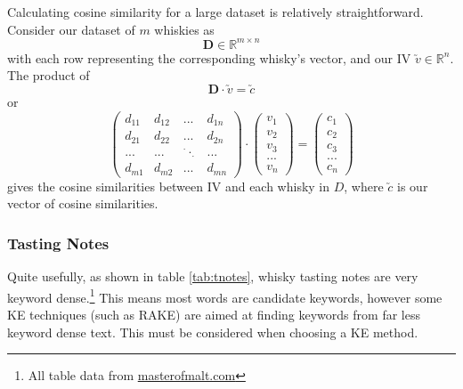 Calculating cosine similarity for a large dataset is relatively straightforward.
Consider our dataset of $m$ whiskies as
\begin{equation}
    \textbf{D} \in \mathbb{R}^{m \times n}
\end{equation}
with each row representing the corresponding whisky's vector, and our IV $\utilde{v} \in \mathbb{R}^{n}$.
The product of 
\begin{equation}
    \textbf{D} \cdot \utilde{v} = \utilde{c}    
\end{equation}
or 
\begin{equation}\label{eqn:cossim}
    \begin{pmatrix}
        d_{11} & d_{12} & ... & d_{1n}\\
        d_{21} & d_{22} & ... & d_{2n}\\
        ...    & ...    & ^{\cdot}\cdot _{\cdot} & ...   \\
        d_{m1} & d_{m2} & ... & d_{mn}
    \end{pmatrix}
    \cdot
    \begin{pmatrix}
        v_1 \\ v_2 \\ v_3 \\ ... \\ v_n
    \end{pmatrix}
    =
    \begin{pmatrix}
        c_1 \\ c_2 \\ c_3 \\ ... \\ c_n
    \end{pmatrix}
\end{equation}
gives the cosine similarities between IV and each whisky in $D$, where $\utilde{c}$ is our vector of cosine similarities.




\subsubsection{Tasting Notes}\label{ssec:tnotes}
Quite usefully, as shown in table \ref{tab:tnotes}, whisky tasting notes are very keyword dense.\footnote{All table data from \href{http://masterofmalt.com/}{masterofmalt.com}}
This means most words are candidate keywords, however some KE techniques (such as RAKE) are aimed at 
finding keywords from far less keyword dense text. This must be considered when choosing a KE method.

